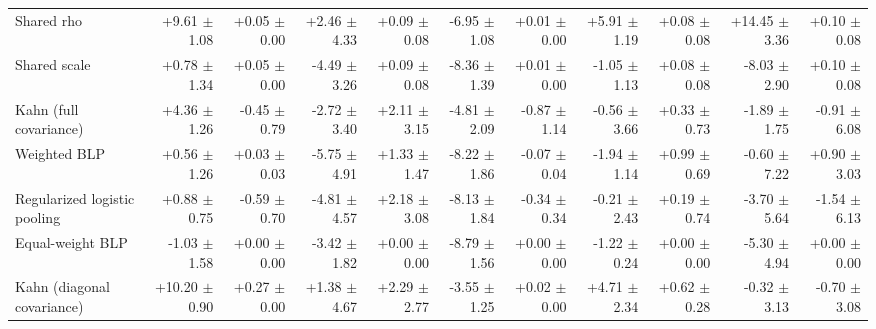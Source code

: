 \begin{tabular}{lrrrrrrrrrr}
Shared rho & +9.61 {\scriptsize $\pm$ 1.08} & +0.05 {\scriptsize $\pm$ 0.00} & +2.46 {\scriptsize $\pm$ 4.33} & +0.09 {\scriptsize $\pm$ 0.08} & -6.95 {\scriptsize $\pm$ 1.08} & +0.01 {\scriptsize $\pm$ 0.00} & +5.91 {\scriptsize $\pm$ 1.19} & +0.08 {\scriptsize $\pm$ 0.08} & +14.45 {\scriptsize $\pm$ 3.36} & +0.10 {\scriptsize $\pm$ 0.08} \\
Shared scale & +0.78 {\scriptsize $\pm$ 1.34} & +0.05 {\scriptsize $\pm$ 0.00} & -4.49 {\scriptsize $\pm$ 3.26} & +0.09 {\scriptsize $\pm$ 0.08} & -8.36 {\scriptsize $\pm$ 1.39} & +0.01 {\scriptsize $\pm$ 0.00} & -1.05 {\scriptsize $\pm$ 1.13} & +0.08 {\scriptsize $\pm$ 0.08} & -8.03 {\scriptsize $\pm$ 2.90} & +0.10 {\scriptsize $\pm$ 0.08} \\
Kahn (full covariance) & +4.36 {\scriptsize $\pm$ 1.26} & -0.45 {\scriptsize $\pm$ 0.79} & -2.72 {\scriptsize $\pm$ 3.40} & +2.11 {\scriptsize $\pm$ 3.15} & -4.81 {\scriptsize $\pm$ 2.09} & -0.87 {\scriptsize $\pm$ 1.14} & -0.56 {\scriptsize $\pm$ 3.66} & +0.33 {\scriptsize $\pm$ 0.73} & -1.89 {\scriptsize $\pm$ 1.75} & -0.91 {\scriptsize $\pm$ 6.08} \\
Weighted BLP & +0.56 {\scriptsize $\pm$ 1.26} & +0.03 {\scriptsize $\pm$ 0.03} & -5.75 {\scriptsize $\pm$ 4.91} & +1.33 {\scriptsize $\pm$ 1.47} & -8.22 {\scriptsize $\pm$ 1.86} & -0.07 {\scriptsize $\pm$ 0.04} & -1.94 {\scriptsize $\pm$ 1.14} & +0.99 {\scriptsize $\pm$ 0.69} & -0.60 {\scriptsize $\pm$ 7.22} & +0.90 {\scriptsize $\pm$ 3.03} \\
Regularized logistic pooling & +0.88 {\scriptsize $\pm$ 0.75} & -0.59 {\scriptsize $\pm$ 0.70} & -4.81 {\scriptsize $\pm$ 4.57} & +2.18 {\scriptsize $\pm$ 3.08} & -8.13 {\scriptsize $\pm$ 1.84} & -0.34 {\scriptsize $\pm$ 0.34} & -0.21 {\scriptsize $\pm$ 2.43} & +0.19 {\scriptsize $\pm$ 0.74} & -3.70 {\scriptsize $\pm$ 5.64} & -1.54 {\scriptsize $\pm$ 6.13} \\
Equal-weight BLP & -1.03 {\scriptsize $\pm$ 1.58} & +0.00 {\scriptsize $\pm$ 0.00} & -3.42 {\scriptsize $\pm$ 1.82} & +0.00 {\scriptsize $\pm$ 0.00} & -8.79 {\scriptsize $\pm$ 1.56} & +0.00 {\scriptsize $\pm$ 0.00} & -1.22 {\scriptsize $\pm$ 0.24} & +0.00 {\scriptsize $\pm$ 0.00} & -5.30 {\scriptsize $\pm$ 4.94} & +0.00 {\scriptsize $\pm$ 0.00} \\
Kahn (diagonal covariance) & +10.20 {\scriptsize $\pm$ 0.90} & +0.27 {\scriptsize $\pm$ 0.00} & +1.38 {\scriptsize $\pm$ 4.67} & +2.29 {\scriptsize $\pm$ 2.77} & -3.55 {\scriptsize $\pm$ 1.25} & +0.02 {\scriptsize $\pm$ 0.00} & +4.71 {\scriptsize $\pm$ 2.34} & +0.62 {\scriptsize $\pm$ 0.28} & -0.32 {\scriptsize $\pm$ 3.13} & -0.70 {\scriptsize $\pm$ 3.08} \\

\end{tabular}
